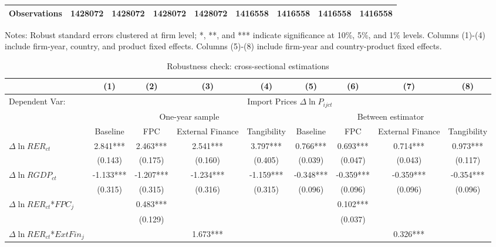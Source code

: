 \begin{table}
\begin{threeparttable}
\begin{tabular}{lcccccccc}
			Observations & 1428072 & 1428072 & 1428072 & 1428072 & 1416558 & 1416558 & 1416558 & 1416558 \\
			\bottomrule
		\end{tabular}
		\begin{tablenotes}
			\footnotesize
			\item Notes: Robust standard errors clustered at firm level; *, **, and *** indicate significance at 10\%, 5\%, and 1\% levels. Columns (1)-(4) include firm-year, country, and product fixed effects.  Columns (5)-(8) include firm-year and country-product fixed effects.
		\end{tablenotes}
	\end{threeparttable}
	\label{tab.robust.fe}
\end{table}

\begin{table}
	\centering
	\caption{Robustness check: cross-sectional estimations}
	\begin{threeparttable}
		\begin{tabular}{lcccccccc}
			\toprule
			& (1)   & (2)   & (3)   & (4) &  (5)  &  (6)  & (7)  & (8)\\
			\midrule
                Dependent Var: & \multicolumn{8}{c}{ Import Prices $\Delta \ln P_{ijct}$} \\
			& \multicolumn{4}{c}{One-year sample} & \multicolumn{4}{c}{Between estimator}\\
			& Baseline & FPC   & External Finance & Tangibility & Baseline & FPC & External Finance & Tangibility\\
			\midrule
			$\Delta \ln RER_{ct}$ & 2.841*** & 2.463*** & 2.541*** & 3.797*** & 0.766*** & 0.693*** & 0.714*** & 0.973*** \\
			& (0.143) & (0.175) & (0.160) & (0.405) & (0.039) & (0.047) & (0.043) & (0.117) \\
			$\Delta \ln RGDP_{ct}$ & -1.133*** & -1.207*** & -1.234*** & -1.159*** & -0.348*** & -0.359*** & -0.359*** & -0.354*** \\
			& (0.315) & (0.315) & (0.316) & (0.315) & (0.096) & (0.096) & (0.096) & (0.096) \\
			$\Delta \ln RER_{ct}$*$FPC_{j}$ &   & 0.483*** &       &       &       & 0.102*** &       &  \\
			&   & (0.129) &       &       &       & (0.037) &       &  \\
			$\Delta \ln RER_{ct}$*$ExtFin_{j}$ &   &       & 1.673*** &       &       &       & 0.326*** &  \\

\end{tabular}
\end{threeparttable}
\end{table}
